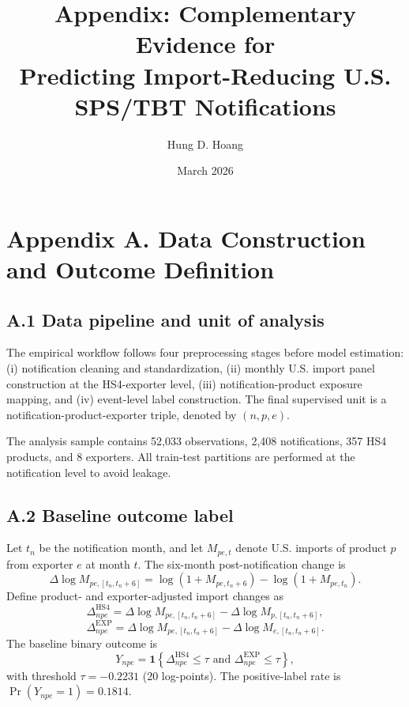 \documentclass[11pt,a4paper]{article}
\title{Appendix: Complementary Evidence for\\
Predicting Import-Reducing U.S. SPS/TBT Notifications}
\author{Hung D. Hoang}
\date{March 2026}
\begin{document}
\maketitle

\section*{Appendix A. Data Construction and Outcome Definition}

\subsection*{A.1 Data pipeline and unit of analysis}
The empirical workflow follows four preprocessing stages before model estimation: (i) notification cleaning and standardization, (ii) monthly U.S. import panel construction at the HS4-exporter level, (iii) notification-product exposure mapping, and (iv) event-level label construction. The final supervised unit is a notification-product-exporter triple, denoted by $(n,p,e)$.

The analysis sample contains 52,033 observations, 2,408 notifications, 357 HS4 products, and 8 exporters. All train-test partitions are performed at the notification level to avoid leakage.

\subsection*{A.2 Baseline outcome label}
Let $t_n$ be the notification month, and let $M_{pe,t}$ denote U.S. imports of product $p$ from exporter $e$ at month $t$. The six-month post-notification change is
\[
\Delta \log M_{pe,[t_n,t_n+6]} = \log(1 + M_{pe,t_n+6}) - \log(1 + M_{pe,t_n}).
\]
Define product- and exporter-adjusted import changes as
\[
\Delta^{\mathrm{HS4}}_{npe} = \Delta \log M_{pe,[t_n,t_n+6]} - \Delta \log M_{p,[t_n,t_n+6]},
\]
\[
\Delta^{\mathrm{EXP}}_{npe} = \Delta \log M_{pe,[t_n,t_n+6]} - \Delta \log M_{e,[t_n,t_n+6]}.
\]
The baseline binary outcome is
\[
Y_{npe} = \mathbf{1}\left\{\Delta^{\mathrm{HS4}}_{npe} \le \tau \text{ and } \Delta^{\mathrm{EXP}}_{npe} \le \tau\right\},
\]
with threshold $\tau = -0.2231$ (20 log-points). The positive-label rate is $\Pr(Y_{npe}=1)=0.1814$.
\end{document}
